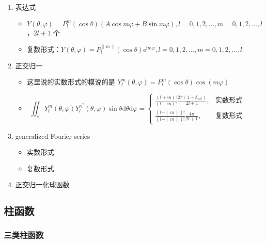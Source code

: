 \documentclass{article}
\begin{document}
\begin{enumerate}
    \item 表达式 \begin{itemize}
              \item $Y(\theta, \varphi)=P^m_l(\cos\theta)(A\cos m\varphi+B\sin m\varphi), l=0, 1, 2, \dots, m=0, 1, 2, \dots,l$，$2l+1$ 个
              \item 复数形式：$Y(\theta, \varphi)=P^{\|m\|}_l(\cos\theta)\mathrm{e}^{\mathrm{i}m\varphi}, l=0, 1, 2, \dots, m=0, 1, 2, \dots,l$
          \end{itemize}
    \item 正交归一 \begin{itemize}
              \item 这里说的实数形式的模说的是 $Y^m_l(\theta, \varphi)=P^m_l(\cos\theta)\cos(m\varphi)$
              \item $$\iint_sY^m_l(\theta, \varphi)Y^{n^*}_l(\theta, \varphi)\sin\theta\mathrm{d}\theta\mathrm{d}\varphi=
                        \begin{cases}\frac{(l+m)!}{(l-m)!}\frac{2\pi(1+\delta_{m0})}{2l+1}, & \text{实数形式} \\
             \frac{(l+\|m\|)!}{(l-\|m\|)!}\frac{4\pi}{2l+1},        & \text{复数形式}
                        \end{cases}$$
          \end{itemize}
    \item generalized Fourier series \begin{itemize}
              \item 实数形式
              \item 复数形式
          \end{itemize}
    \item 正交归一化球函数
\end{enumerate}

\subsection{柱函数}

\subsubsection{三类柱函数}
\end{document}
